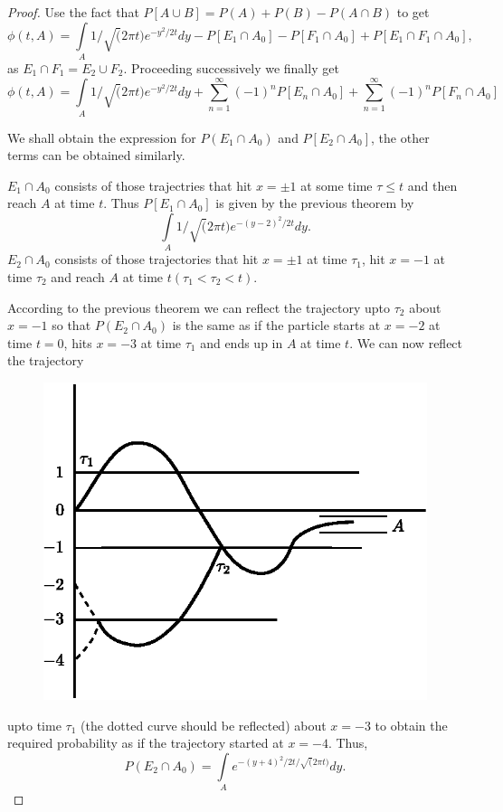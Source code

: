 \begin{proof}
Use the fact that $P[A\cup B]=P(A)+P(B)-P(A\cap B)$ to get
$$
\phi(t,A)=\int\limits_{A}1/\surd(2\pi t)e^{-y^{2}/2t}dy-P[E_{1}\cap
  A_{0}]-P[F_{1}\cap A_{0}]+P[E_{1}\cap F_{1}\cap A_{0}],
$$
as $E_{1}\cap F_{1}=E_{2}\cup F_{2}$. Proceeding successively we
finally get
$$
\phi(t,A)=\int\limits_{A}1/\surd(2\pi
t)e^{-y^{2}/2t}dy+\sum\limits^{\infty}_{n=1}(-1)^{n}P[E_{n}\cap
  A_{0}]+\sum\limits^{\infty}_{n=1}(-1)^{n}P[F_{n}\cap A_{0}]
$$

We shall obtain the expression for $P(E_{1}\cap A_{0})$ and
$P[E_{2}\cap A_{0}]$, the other terms can be obtained similarly.

$E_{1}\cap A_{0}$ consists of those trajectries that hit $x=\pm 1$ at
some time $\tau\leq t$ and then reach $A$ at time $t$. Thus
$P[E_{1}\cap A_{0}]$ is given by the previous theorem by
$$
\int\limits_{A}1/\surd(2\pi t)e^{-(y-2)^{2}/2t}dy.
$$\pageoriginale
$E_{2}\cap A_{0}$ consists of those trajectories that hit $x=\pm 1$ at
time $\tau_{1}$, hit $x=-1$ at time $\tau_{2}$ and reach $A$ at time
$t(\tau_{1}<\tau_{2}<t)$.

According to the previous theorem we can reflect the trajectory upto
$\tau_{2}$ about $x=-1$ so that $P(E_{2}\cap A_{0})$ is the same as if
the particle starts at $x=-2$ at time $t=0$, hits $x=-3$ at time
$\tau_{1}$ and ends up in $A$ at time $t$. We can now reflect the
trajectory
\begin{figure}[H]
\centering
\includegraphics{figure/fig8.eps}
\end{figure}
\noindent
upto time $\tau_{1}$ (the dotted curve should be reflected) about
$x=-3$ to obtain the required probability as if the trajectory started
at $x=-4$. Thus,
$$
P(E_{2}\cap A_{0})=\int\limits_{A}e^{-(y+4)^{2}/2t/\surd(2\pi t)}dy.
$$


\end{proof}
